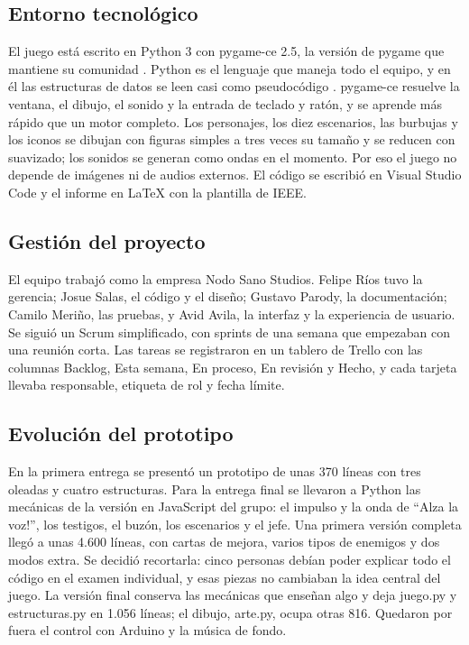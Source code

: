 \documentclass[conference]{IEEEtran}
\begin{document}
\subsection{Entorno tecnológico}

El juego está escrito en Python 3 con pygame-ce 2.5, la versión de pygame que mantiene su comunidad \cite{ref10}. Python es el lenguaje que maneja todo el equipo, y en él las estructuras de datos se leen casi como pseudocódigo \cite{ref11}. pygame-ce resuelve la ventana, el dibujo, el sonido y la entrada de teclado y ratón, y se aprende más rápido que un motor completo. Los personajes, los diez escenarios, las burbujas y los iconos se dibujan con figuras simples a tres veces su tamaño y se reducen con suavizado; los sonidos se generan como ondas en el momento. Por eso el juego no depende de imágenes ni de audios externos. El código se escribió en Visual Studio Code y el informe en LaTeX con la plantilla de IEEE.

\subsection{Gestión del proyecto}

El equipo trabajó como la empresa Nodo Sano Studios. Felipe Ríos tuvo la gerencia; Josue Salas, el código y el diseño; Gustavo Parody, la documentación; Camilo Meriño, las pruebas, y Avid Avila, la interfaz y la experiencia de usuario. Se siguió un Scrum simplificado, con sprints de una semana que empezaban con una reunión corta. Las tareas se registraron en un tablero de Trello con las columnas Backlog, Esta semana, En proceso, En revisión y Hecho, y cada tarjeta llevaba responsable, etiqueta de rol y fecha límite.

\subsection{Evolución del prototipo}

En la primera entrega se presentó un prototipo de unas 370 líneas con tres oleadas y cuatro estructuras. Para la entrega final se llevaron a Python las mecánicas de la versión en JavaScript del grupo: el impulso y la onda de ``\textexclamdown{}Alza la voz!'', los testigos, el buzón, los escenarios y el jefe. Una primera versión completa llegó a unas 4.600 líneas, con cartas de mejora, varios tipos de enemigos y dos modos extra. Se decidió recortarla: cinco personas debían poder explicar todo el código en el examen individual, y esas piezas no cambiaban la idea central del juego. La versión final conserva las mecánicas que enseñan algo y deja juego.py y estructuras.py en 1.056 líneas; el dibujo, arte.py, ocupa otras 816. Quedaron por fuera el control con Arduino y la música de fondo.
\end{document}
